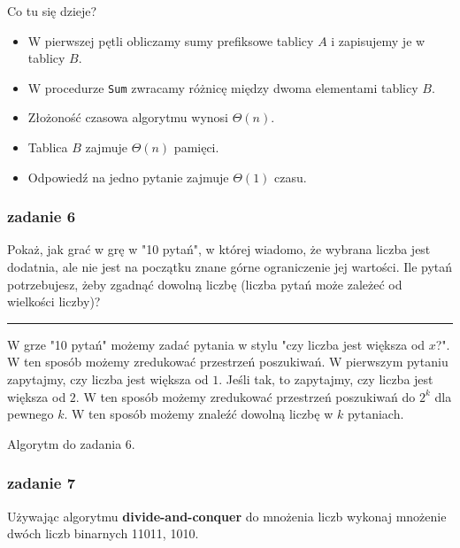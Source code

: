 \documentclass[11pt,a4paper]{article}
\begin{document}
Co tu się dzieje?
\begin{itemize}
    \item W pierwszej pętli obliczamy sumy prefiksowe tablicy $A$ i zapisujemy je w tablicy $B$.
    \item W procedurze \texttt{Sum} zwracamy różnicę między dwoma elementami tablicy $B$.
\end{itemize}

\begin{itemize}
    \item Złożoność czasowa algorytmu wynosi $\Theta(n)$.
    \item Tablica $B$ zajmuje $\Theta(n)$ pamięci.
    \item Odpowiedź na jedno pytanie zajmuje $\Theta(1)$ czasu.
\end{itemize}

\subsubsection{zadanie 6}
Pokaż, jak grać w grę w "10 pytań", w której wiadomo, że wybrana liczba jest dodatnia, ale nie jest na początku znane górne ograniczenie jej wartości. Ile pytań potrzebujesz, żeby zgadnąć dowolną liczbę (liczba pytań może zależeć od wielkości liczby)?

\bigskip
\hrule
\bigskip

W grze "10 pytań" możemy zadać pytania w stylu "czy liczba jest większa od $x$?". W ten sposób możemy zredukować przestrzeń poszukiwań. W pierwszym pytaniu zapytajmy, czy liczba jest większa od $1$. Jeśli tak, to zapytajmy, czy liczba jest większa od $2$. W ten sposób możemy zredukować przestrzeń poszukiwań do $2^k$ dla pewnego $k$. W ten sposób możemy znaleźć dowolną liczbę w $k$ pytaniach.
\begin{algorithm}
    \caption{Algorytm do zadania 6.}
    \begin{algorithmic}[1]
        \EndWhile
    \end{algorithmic}
\end{algorithm}


\subsubsection{zadanie 7}
Używając algorytmu \textbf{divide-and-conquer} do mnożenia liczb wykonaj mnożenie dwóch liczb binarnych 11011, 1010.
\end{document}
